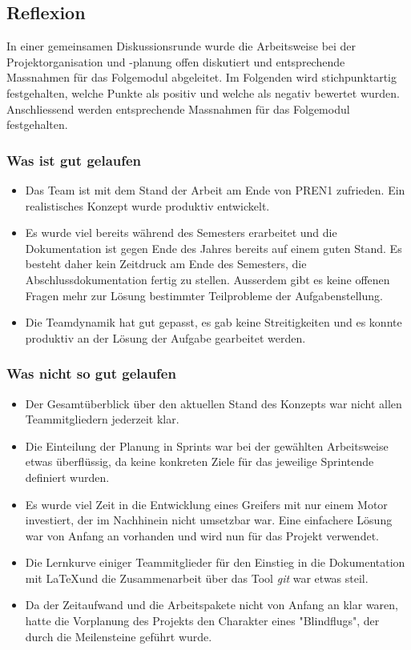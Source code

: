 \documentclass[main.tex]{subfiles} %
\begin{document}
\subsection{Reflexion}
In einer gemeinsamen Diskussionsrunde wurde die Arbeitsweise bei der
Projektorganisation und -planung offen diskutiert und entsprechende Massnahmen
für das Folgemodul abgeleitet. Im Folgenden wird stichpunktartig festgehalten,
welche Punkte als positiv und welche als negativ bewertet wurden. Anschliessend
werden entsprechende Massnahmen für das Folgemodul festgehalten.

\subsubsection*{Was ist gut gelaufen}

\begin{itemize}
    \item Das Team ist mit dem Stand der Arbeit am Ende von PREN1 zufrieden. Ein
          realistisches Konzept wurde produktiv entwickelt.
    \item Es wurde viel bereits während des Semesters erarbeitet und die Dokumentation
          ist gegen Ende des Jahres bereits auf einem guten Stand. Es besteht daher kein
          Zeitdruck am Ende des Semesters, die Abschlussdokumentation fertig zu stellen.
          Ausserdem gibt es keine offenen Fragen mehr zur Lösung bestimmter Teilprobleme
          der Aufgabenstellung.
    \item Die Teamdynamik hat gut gepasst, es gab keine Streitigkeiten und es konnte
          produktiv an der Lösung der Aufgabe gearbeitet werden.
\end{itemize}

\subsubsection*{Was nicht so gut gelaufen}

\begin{itemize}
    \item Der Gesamtüberblick über den aktuellen Stand des Konzepts war nicht allen
          Teammitgliedern jederzeit klar.
    \item Die Einteilung der Planung in Sprints war bei der gewählten Arbeitsweise etwas
          überflüssig, da keine konkreten Ziele für das jeweilige Sprintende definiert
          wurden.
    \item Es wurde viel Zeit in die Entwicklung eines Greifers mit nur einem Motor
          investiert, der im Nachhinein nicht umsetzbar war. Eine einfachere Lösung war
          von Anfang an vorhanden und wird nun für das Projekt verwendet.
    \item Die Lernkurve einiger Teammitglieder für den Einstieg in die Dokumentation mit
          \LaTeX und die Zusammenarbeit über das Tool \textit{git} war etwas steil.
    \item Da der Zeitaufwand und die Arbeitspakete nicht von Anfang an klar waren, hatte
          die Vorplanung des Projekts den Charakter eines "Blindflugs", der durch die
          Meilensteine geführt wurde.

\end{itemize}
\end{document}

